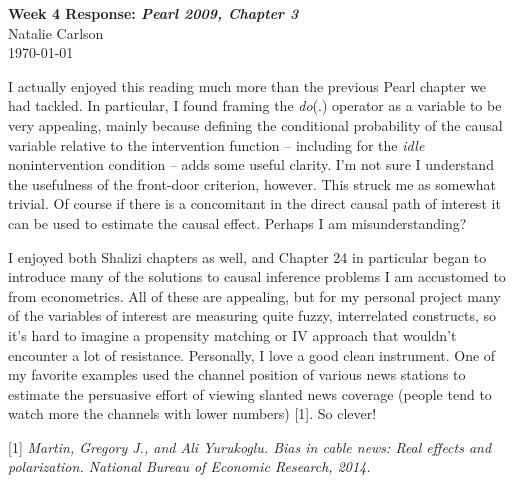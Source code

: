 \documentclass[12pt]{article}
\begin{document}
\begin{center}
  \Large \textbf{Week 4 Response: \textit{Pearl 2009, Chapter 3}} \\
  \vspace{0.1in}
  \normalsize Natalie Carlson \\
  \today
\end{center}

I actually enjoyed this reading much more than the previous Pearl chapter we had tackled. In particular, I found framing the \textit{do}(.) operator as a variable to be very appealing, mainly because defining the conditional probability of the causal variable relative to the intervention function -- including for the \textit{idle} nonintervention condition -- adds some useful clarity. I'm not sure I understand the usefulness of the front-door criterion, however. This struck me as somewhat trivial. Of course if there is a concomitant in the direct causal path of interest it can be used to estimate the causal effect. Perhaps I am misunderstanding?

I enjoyed both Shalizi chapters as well, and Chapter 24 in particular began to introduce many of the solutions to causal inference problems I am accustomed to from econometrics. All of these are appealing, but for my personal project many of the variables of interest are measuring quite fuzzy, interrelated constructs, so it's hard to imagine a propensity matching or IV approach that wouldn't encounter a lot of resistance. Personally, I love a good clean instrument. One of my favorite examples used the channel position of various news stations to estimate the persuasive effort of viewing slanted news coverage (people tend to watch more the channels with lower numbers) [1]. So clever!


[1] \textit{Martin, Gregory J., and Ali Yurukoglu. Bias in cable news: Real effects and polarization. National Bureau of Economic Research, 2014.}
\end{document}
